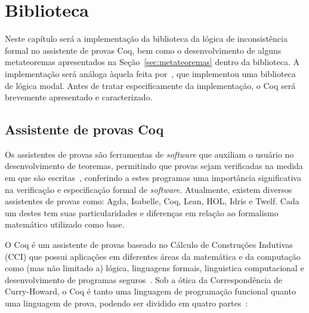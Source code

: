 \chapter{Biblioteca}\label{cap:biblioteca}

Neste capítulo será  a implementação da biblioteca da lógica de inconsistência formal \lfium{} no assistente de provas Coq, bem como o desenvolvimento de alguns metateoremas apresentados na Seção~\ref{sec:metateoremas} dentro da biblioteca. A implementação será análoga àquela feita por~, que implementou uma biblioteca de lógica modal. Antes de tratar especificamente da implementação, o Coq será brevemente apresentado e caracterizado.

\section{Assistente de provas Coq}\label{sec:coq}
    Os assistentes de provas são ferramentas de \textit{software} que auxiliam o usuário no desenvolvimento de teoremas, permitindo que provas sejam verificadas na medida em que são escritas~\cite{geuvers2009proof}, conferindo a estes programas uma importância significativa na verificação e especificação formal de \textit{software}. Atualmente, existem diversos assistentes de provas como: Agda, Isabelle, Coq, Lean, HOL, Idris e Twelf. Cada um destes tem suas particularidades e diferenças em relação ao formalismo matemático utilizado como base.

    O Coq é um assistente de provas baseado no Cálculo de Construções Indutivas (CCI) que possui aplicações em diferentes áreas da matemática e da computação como (mas não limitado a) lógica, linguagens formais, linguistica computacional e desenvolvimento de programas seguros~\cite{coqart}. Sob a ótica da Correspondência de Curry{-}Howard, o Coq é tanto uma linguagem de programação funcional quanto uma linguagem de prova, podendo ser dividido em quatro partes~\cite{silva2019certificaccao}:
    
